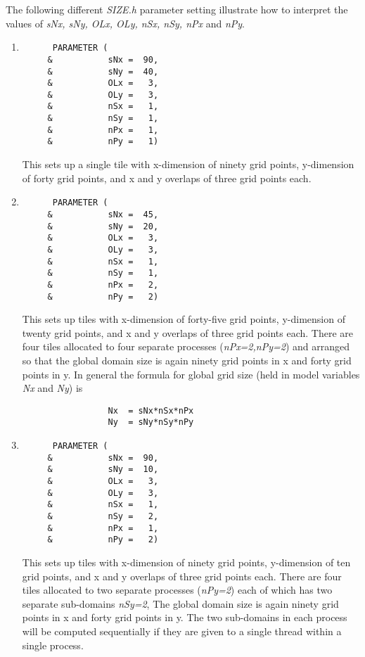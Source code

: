 The following different {\em SIZE.h} parameter setting illustrate how to
interpret the values of {\em sNx, sNy, OLx, OLy, nSx, nSy, nPx}
and {\em nPy}.
\begin{enumerate}
\item
\begin{verbatim}
      PARAMETER (
     &           sNx =  90,
     &           sNy =  40,
     &           OLx =   3,
     &           OLy =   3,
     &           nSx =   1,
     &           nSy =   1,
     &           nPx =   1,
     &           nPy =   1)
\end{verbatim}
This sets up a single tile with x-dimension of ninety grid points, y-dimension of
forty grid points, and x and y overlaps of three grid points each.
\item
\begin{verbatim}
      PARAMETER (
     &           sNx =  45,
     &           sNy =  20,
     &           OLx =   3,
     &           OLy =   3,
     &           nSx =   1,
     &           nSy =   1,
     &           nPx =   2,
     &           nPy =   2)
\end{verbatim}
This sets up tiles with x-dimension of forty-five grid points, y-dimension of
twenty grid points, and x and y overlaps of three grid points each. There are
four tiles allocated to four separate processes ({\em nPx=2,nPy=2}) and
arranged so that the global domain size is again ninety grid points in x and
forty grid points in y. In general the formula for global grid size (held in
model variables {\em Nx} and {\em Ny}) is
\begin{verbatim}
                 Nx  = sNx*nSx*nPx
                 Ny  = sNy*nSy*nPy
\end{verbatim}
\item
\begin{verbatim}
      PARAMETER (
     &           sNx =  90,
     &           sNy =  10,
     &           OLx =   3,
     &           OLy =   3,
     &           nSx =   1,
     &           nSy =   2,
     &           nPx =   1,
     &           nPy =   2)
\end{verbatim}
This sets up tiles with x-dimension of ninety grid points, y-dimension of
ten grid points, and x and y overlaps of three grid points each. There are
four tiles allocated to two separate processes ({\em nPy=2}) each of which
has two separate sub-domains {\em nSy=2},
The global domain size is again ninety grid points in x and
forty grid points in y. The two sub-domains in each process will be computed 
sequentially if they are given to a single thread within a single process.

\end{enumerate}
